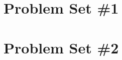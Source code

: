 \documentclass[11pt]{report}
\theoremstyle{plain}
\def\psetbackref{1}
\begin{document}

\def\psetbackref{0}

\newpage
\section*{Problem Set \#1}
\begin{enumerate}[(1)]
\end{enumerate}

\newpage
\section*{Problem Set \#2}

\begin{enumerate}[(1)]
\end{enumerate}
\end{document}
